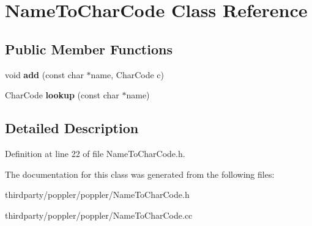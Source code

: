 \hypertarget{class_name_to_char_code}{}\section{Name\+To\+Char\+Code Class Reference}
\label{class_name_to_char_code}
\subsection*{Public Member Functions}
\begin{DoxyCompactItemize}
\item 
\mbox{\label{class_name_to_char_code_a0c7b07c4671c35ea8976aeba7b6664aa}} 
void {\bfseries add} (const char $\ast$name, Char\+Code c)
\item 
\mbox{\label{class_name_to_char_code_a8786092b6a7dd07ec61c622d0fef8778}} 
Char\+Code {\bfseries lookup} (const char $\ast$name)
\end{DoxyCompactItemize}


\subsection{Detailed Description}


Definition at line 22 of file Name\+To\+Char\+Code.\+h.



The documentation for this class was generated from the following files\+:\begin{DoxyCompactItemize}
\item 
thirdparty/poppler/poppler/Name\+To\+Char\+Code.\+h\item 
thirdparty/poppler/poppler/Name\+To\+Char\+Code.\+cc\end{DoxyCompactItemize}
